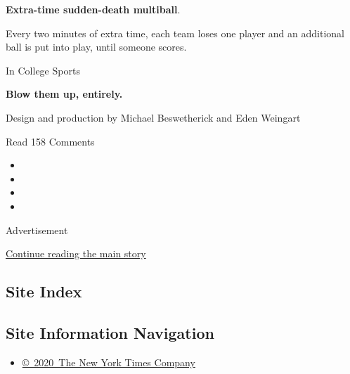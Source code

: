 \textbf{Extra-time sudden-death multiball}.

Every two minutes of extra time, each team loses one player and an
additional ball is put into play, until someone scores.

In College Sports

\textbf{Blow them up, entirely.}

Design and production by Michael Beswetherick and Eden Weingart

Read 158 Comments

\begin{itemize}
\item
\item
\item
\item
\end{itemize}

Advertisement

\protect\hyperlink{after-bottom}{Continue reading the main story}

\hypertarget{site-index}{%
\subsection{Site Index}\label{site-index}}

\hypertarget{site-information-navigation}{%
\subsection{Site Information
Navigation}\label{site-information-navigation}}

\begin{itemize}
\tightlist
\item
  \href{https://help.nytimes3xbfgragh.onion/hc/en-us/articles/115014792127-Copyright-notice}{©~2020~The
  New York Times Company}
\end{itemize}

